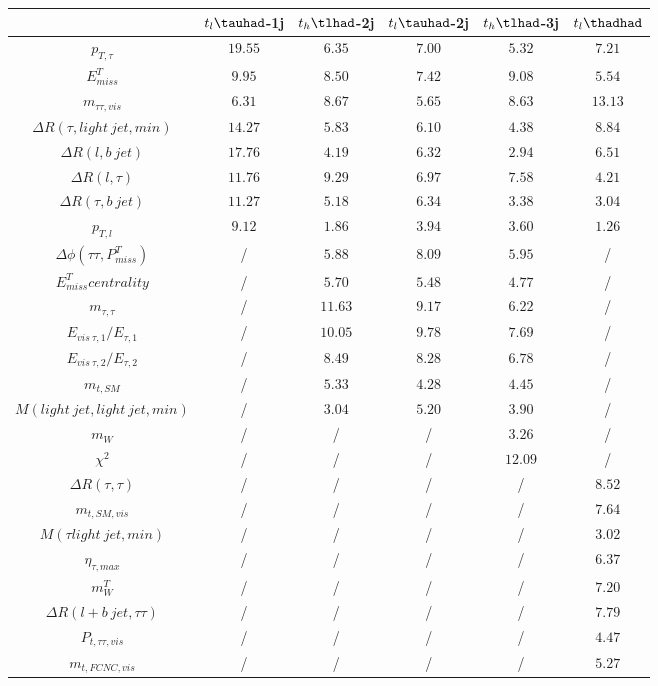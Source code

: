 \centering
\begin{tabular}{|c|c|c|c|c|c|} \hline
 & $t_{l}\tauhad$-1j & $t_{h}\tlhad$-2j & $t_{l}\tauhad$-2j & $t_{h}\tlhad$-3j & $t_l\thadhad$\\\hline
$p_{T,\tau }$ & $19.55$ & $6.35$ & $7.00$ & $5.32$ & $7.21$\\\hline
$E^{T}_{miss}$ & $9.95$ & $8.50$ & $7.42$ & $9.08$ & $5.54$\\\hline
$m_{\tau \tau ,vis}$ & $6.31$ & $8.67$ & $5.65$ & $8.63$ & $13.13$\\\hline
$\Delta R(\tau ,light~jet,min)$ & $14.27$ & $5.83$ & $6.10$ & $4.38$ & $8.84$\\\hline
$\Delta R(l,b~jet)$ & $17.76$ & $4.19$ & $6.32$ & $2.94$ & $6.51$\\\hline
$\Delta R(l,\tau )$ & $11.76$ & $9.29$ & $6.97$ & $7.58$ & $4.21$\\\hline
$\Delta R(\tau ,b~jet)$ & $11.27$ & $5.18$ & $6.34$ & $3.38$ & $3.04$\\\hline
$p_{T,l}$ & $9.12$ & $1.86$ & $3.94$ & $3.60$ & $1.26$\\\hline
$\Delta\phi(\tau \tau ,P^{T}_{miss})$ &  / & $5.88$ & $8.09$ & $5.95$ &  /\\\hline
$E^{T}_{miss} centrality$ &  / & $5.70$ & $5.48$ & $4.77$ &  /\\\hline
$m_{\tau ,\tau }$ &  / & $11.63$ & $9.17$ & $6.22$ &  /\\\hline
$E_{vis~\tau ,1}/E_{\tau ,1}$ &  / & $10.05$ & $9.78$ & $7.69$ &  /\\\hline
$E_{vis~\tau ,2}/E_{\tau ,2}$ &  / & $8.49$ & $8.28$ & $6.78$ &  /\\\hline
$m_{t,SM}$ &  / & $5.33$ & $4.28$ & $4.45$ &  /\\\hline
$M(light~jet,light~jet,min)$ &  / & $3.04$ & $5.20$ & $3.90$ &  /\\\hline
$m_{W}$ &  / &  / &  / & $3.26$ &  /\\\hline
$\chi^{2}$ &  / &  / &  / & $12.09$ &  /\\\hline
$\Delta R(\tau ,\tau )$ &  / &  / &  / &  / & $8.52$\\\hline
$m_{t,SM,vis}$ &  / &  / &  / &  / & $7.64$\\\hline
$M(\tau  light~jet,min)$ &  / &  / &  / &  / & $3.02$\\\hline
$\eta_{\tau ,max}$ &  / &  / &  / &  / & $6.37$\\\hline
$m^{T}_{W}$ &  / &  / &  / &  / & $7.20$\\\hline
$\Delta R(l+b~jet,\tau \tau )$ &  / &  / &  / &  / & $7.79$\\\hline
$P_{t,\tau \tau ,vis}$ &  / &  / &  / &  / & $4.47$\\\hline
$m_{t,FCNC,vis}$ &  / &  / &  / &  / & $5.27$\\\hline
\end{tabular}
